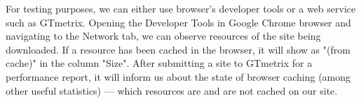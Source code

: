 For testing purposes, we can either use browser's developer tools or a web service such as GTmetrix. Opening the Developer Tools in Google Chrome browser and navigating to the Network tab, we can observe resources of the site being downloaded. If a resource has been cached in the browser, it will show as "(from cache)" in the column "Size". After submitting a site to GTmetrix for a performance report, it will inform us about the state of browser caching (among other useful statistics) — which resources are and are not cached on our site.
